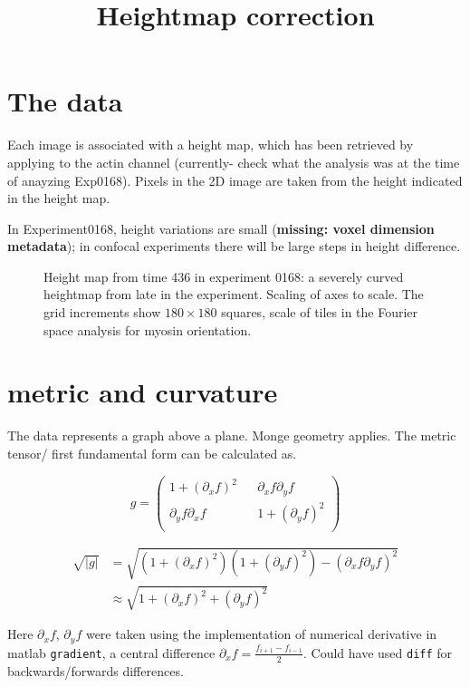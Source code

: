 \documentclass[10pt,a4paper]{article}
\title{Heightmap correction}
\begin{document}
\section{The data}
Each image is associated with a height map, which has been retrieved by applying \texttt{} to the actin channel (currently- check what the analysis was at the time of anayzing Exp0168).  Pixels in the 2D image are taken from the height indicated in the height map.  

In Experiment0168, height variations are small (\textbf{missing: voxel dimension metadata}); in confocal experiments there will be large steps in height difference.

\begin{figure}
\caption{Height map from time 436 in experiment 0168: a severely curved heightmap from late in the experiment.  Scaling of axes to scale.  The grid increments show $180 \times 180$ squares, scale of tiles in the Fourier space analysis for myosin orientation.}
\end{figure}
\section{metric and curvature}
The data represents a graph above a plane.  Monge geometry applies.  The metric tensor/ first fundamental form can be calculated as.

\begin{equation}
g =  \begin{pmatrix}
1+(\partial_x f) ^2 &&\partial_x f \partial_y f \\
\partial_y f \partial_x f && 1+ (\partial_y f)^2\\
\end{pmatrix}
\end{equation}

\begin{equation}
\begin{aligned}
\sqrt{|g|} &=  \sqrt{(1 + (\partial_x f)^2)(1 + (\partial_y f)^2)-(\partial_x f \partial_y f)^2}\\
&\approx \sqrt{1 + (\partial_x f)^2 + (\partial_y f)^2}
\end{aligned}
\end{equation}

Here $\partial_x f$, $\partial_y f$ were taken using the implementation of numerical derivative in matlab \texttt{gradient}, a central difference $\partial_x f = \frac{f_{i+1}-f_{i-1}}{2}$.  Could have used \texttt{diff} for backwards/forwards differences.
\end{document}

